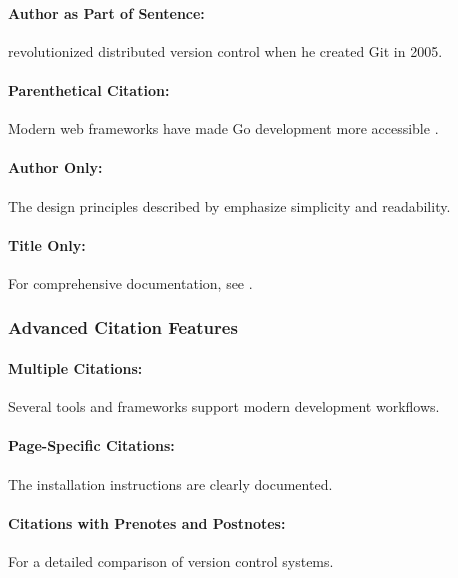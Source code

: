 \paragraph{Author as Part of Sentence:}
\textcite{git} revolutionized distributed version control when he created Git in 2005.
\\

\paragraph{Parenthetical Citation:}
Modern web frameworks have made Go development more accessible \parencite{gin-framework}.
\\

\paragraph{Author Only:}
The design principles described by \citeauthor{golang-docs} emphasize simplicity and readability.
\\

\paragraph{Title Only:}
For comprehensive documentation, see .
\\

\subsubsection{Advanced Citation Features}

\paragraph{Multiple Citations:}
Several tools and frameworks support modern development workflows\cite{git,golang-docs,gin-framework}.
\\

\paragraph{Page-Specific Citations:}
The installation instructions are clearly documented\cite[S.~15]{golang-docs}.
\\

\paragraph{Citations with Prenotes and Postnotes:}
For a detailed comparison of version control systems\cite[see][S.~42--45]{git}.
\\

